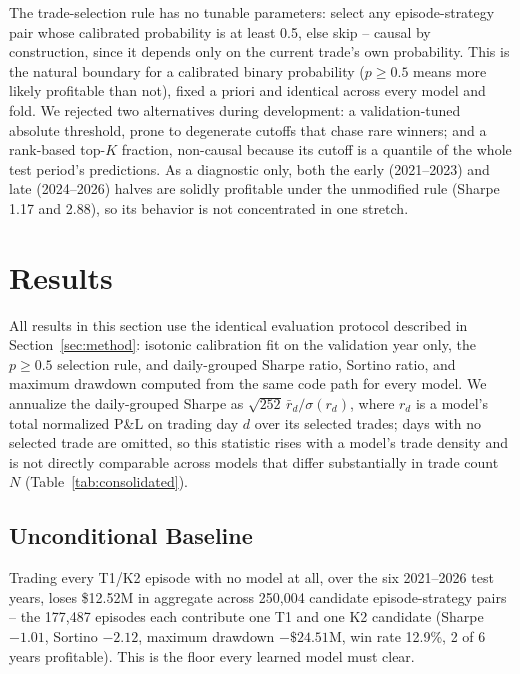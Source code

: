 \documentclass[sigconf,review,anonymous]{acmart}
\begin{document}
The trade-selection rule has no tunable parameters: select any episode-strategy pair whose calibrated probability is at least 0.5, else skip -- causal by construction, since it depends only on the current trade's own probability. This is the natural boundary for a calibrated binary probability ($p\ge0.5$ means more likely profitable than not), fixed a priori and identical across every model and fold. We rejected two alternatives during development: a validation-tuned absolute threshold, prone to degenerate cutoffs that chase rare winners; and a rank-based top-$K$ fraction, non-causal because its cutoff is a quantile of the whole test period's predictions. As a diagnostic only, both the early (2021--2023) and late (2024--2026) halves are solidly profitable under the unmodified rule (Sharpe 1.17 and 2.88), so its behavior is not concentrated in one stretch.

\section{Results}
\label{sec:results}

All results in this section use the identical evaluation protocol described in Section~\ref{sec:method}: isotonic calibration fit on the validation year only, the $p \ge 0.5$ selection rule, and daily-grouped Sharpe ratio, Sortino ratio, and maximum drawdown computed from the same code path for every model. We annualize the daily-grouped Sharpe as $\sqrt{252}\,\bar{r}_d/\sigma(r_d)$, where $r_d$ is a model's total normalized P\&L on trading day $d$ over its selected trades; days with no selected trade are omitted, so this statistic rises with a model's trade density and is not directly comparable across models that differ substantially in trade count $N$ (Table~\ref{tab:consolidated}).

\subsection{Unconditional Baseline}
Trading every T1/K2 episode with no model at all, over the six 2021--2026 test years, loses \$12.52M in aggregate across 250{,}004 candidate episode-strategy pairs -- the 177{,}487 episodes each contribute one T1 and one K2 candidate (Sharpe $-1.01$, Sortino $-2.12$, maximum drawdown $-\$24.51$M, win rate 12.9\%, 2 of 6 years profitable). This is the floor every learned model must clear.
\end{document}
